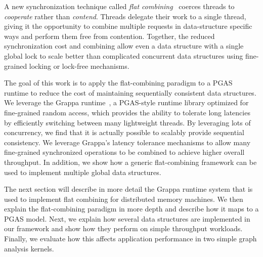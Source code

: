 A new synchronization technique called \emph{flat combining}~\cite{flatCombining} coerces threads to \emph{cooperate} rather than \emph{contend}.
Threads delegate their work to a single thread, giving it the opportunity to combine multiple requests in data-structure specific ways and perform them free from contention.
Together, the reduced synchronization cost and combining allow even a data structure with a single global lock to scale better than complicated concurrent data structures using fine-grained locking or lock-free mechanisms.

The goal of this work is to apply the flat-combining paradigm to a PGAS runtime to reduce the cost of maintaining sequentially consistent data structures.
We leverage the Grappa runtime~\cite{Nelson:hotpar11-real}, a PGAS-style runtime library optimized for fine-grained random access, which provides the ability to tolerate long latencies by efficiently switching between many lightweight threads.
By leveraging lots of concurrency, we find that it is actually possible to scalably provide sequential consistency. We leverage Grappa's latency tolerance mechanisms to allow many fine-grained synchronized operations to be combined to achieve higher overall throughput.
In addition, we show how a generic flat-combining framework can be used to implement multiple global data structures.

The next section will describe in more detail the Grappa runtime system that is used to implement flat combining for distributed memory machines. We then explain the flat-combining paradigm in more depth and describe how it maps to a PGAS model. Next, we explain how several data structures are implemented in our framework and show how they perform on simple throughput workloads. Finally, we evaluate how this affects application performance in two simple graph analysis kernels.
